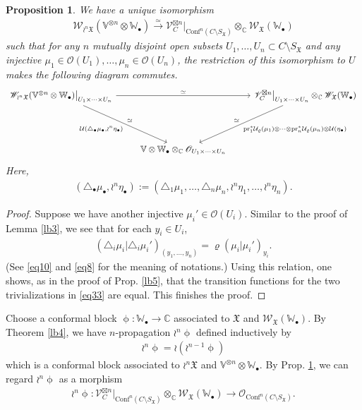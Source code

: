 \documentclass[12pt,a4paper,notitlepage]{article}
\theoremstyle{definition}
\theoremstyle{plain}
\newtheorem{pp}[df]{Proposition}
\newcommand{\fk}{\mathfrak}
\newcommand{\mc}{\mathcal}
\newcommand{\Conf}{\mathrm{Conf}}
\newcommand{\scr}{\mathscr}
\newcommand{\SX}{{S_{\fk X}}}
\newcommand{\blt}{\bullet}
\newcommand{\Vbb}{\mathbb V}
\newcommand{\Wbb}{\mathbb W}
\newcommand{\Cbb}{\mathbb C}
\newcommand{\pr}{\mathrm {pr}}
\numberwithin{equation}{section}
\begin{document}
\begin{pp}\label{lb16}
We have a unique isomorphism
\begin{align}
\scr W_{\wr^n\fk X}(\Vbb^{\otimes n}\otimes\Wbb_\blt)\xrightarrow{\simeq}\scr V_C^{\boxtimes n}\big|_{\Conf^n(C\setminus\SX)}\otimes_\Cbb \scr W_{\fk X}(\Wbb_\blt)	
\end{align}
such that for any $n$ mutually disjoint open subsets $U_1,\dots,U_n\subset C\setminus\SX$ and any injective $\mu_1\in\scr O(U_1),\dots,\mu_n\in\scr O(U_n)$, the restriction of this isomorphism to $U$ makes the following diagram commutes.
\begin{equation}
\begin{tikzcd}
\scr W_{\wr^n\fk X}(\Vbb^{\otimes n}\otimes\Wbb_\blt)\big|_{U_1\times\cdots\times U_n} \arrow[rr,"\simeq"] \arrow[ddr, "\simeq" ,"{\mc U(\triangle_\blt\mu_\blt,\wr^n\eta_\blt)}"']  && \scr V_C^{\boxtimes n}\big|_{U_1\times\cdots\times U_n}\otimes_\Cbb\scr W_{\fk X}(\Wbb_\blt)	 \arrow[ddl,"\simeq"',"{\pr_1^*\mc U_\varrho(\mu_1)\otimes\cdots\otimes\pr_n^*\mc U_\varrho(\mu_n)\otimes \mc U(\eta_\blt)}"]\\
{}\\
& \Vbb\otimes\Wbb_\blt\otimes_\Cbb \scr O_{U_1\times\cdots\times U_n}
\end{tikzcd}\label{eq33}	
\end{equation}
Here,
\begin{gather*}
(\triangle_\blt\mu_\blt,\wr^n\eta_\blt):=(\triangle_1\mu_1,\dots,\triangle_n\mu_n,\wr^n\eta_1,\dots,\wr^n\eta_n).	
\end{gather*}
\end{pp}


\begin{proof}
Suppose we have another injective $\mu_i'\in\scr O(U_i)$. Similar to the proof of Lemma \ref{lb3}, we see that for each $y_i\in U_i$,
\begin{align*}
(\triangle_i\mu_i|\triangle_i\mu_i')_{(y_1,\dots,y_n)}=\varrho(\mu_i|\mu_i')_{y_i}.	
\end{align*}
(See  \eqref{eq10} and \eqref{eq8} for the meaning of notations.) Using this relation, one shows, as in the proof of Prop. \ref{lb5}, that the transition functions for the two trivializations in \eqref{eq33} are equal. This finishes the proof.
\end{proof}




Choose a conformal block $\upphi:\Wbb_\blt\rightarrow\Cbb$ associated to $\fk X$ and $\scr W_{\fk X}(\Wbb_\blt)$. By Theorem \ref{lb4}, we have $n$-propagation $\wr^n\upphi$ defined inductively by
\begin{align*}
\wr^n\upphi=\wr(\wr^{n-1}\upphi)
\end{align*}
which is a conformal block associated to $\wr^n\fk X$ and $\Vbb^{\otimes n}\otimes\Wbb_\blt$. By Prop. \ref{lb16}, we can regard $\wr^n\upphi$ as a morphism
\begin{align*}
\wr^n\upphi:\scr V_C^{\boxtimes n}\big|_{\Conf^n(C\setminus\SX)}\otimes_\Cbb\scr W_{\fk X}(\Wbb_\blt)	\rightarrow\scr O_{\Conf^n(C\setminus\SX)}.	
\end{align*}
\end{document}
